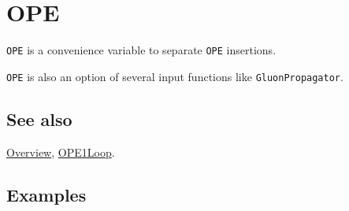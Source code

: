 \documentclass[../FeynCalcManual.tex]{subfiles}
\begin{document}
\hypertarget{ope}{
\section{OPE}\label{ope}}

\texttt{OPE} is a convenience variable to separate \texttt{OPE}
insertions.

\texttt{OPE} is also an option of several input functions like
\texttt{GluonPropagator}.

\subsection{See also}

\hyperlink{toc}{Overview}, \hyperlink{ope1loop}{OPE1Loop}.

\subsection{Examples}
\end{document}

